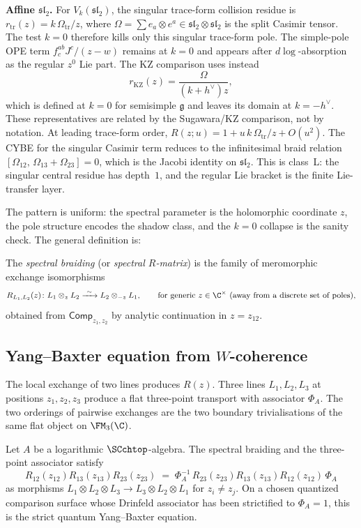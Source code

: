 \medskip
\noindent\textbf{Affine $\mathfrak{sl}_2$.}
For $V_k(\mathfrak{sl}_2)$, the singular trace-form collision residue
is \(r_{\mathrm{tr}}(z)=k\,\Omega_{\mathrm{tr}}/z\), where
\(\Omega=\sum e_a\otimes e^a\in\mathfrak{sl}_2\otimes
\mathfrak{sl}_2\) is the split Casimir tensor. The test \(k=0\)
therefore kills only this singular trace-form pole. The simple-pole
OPE term \(f^{ab}_{c}J^c/(z-w)\) remains at \(k=0\) and appears after
\(d\log\)-absorption as the regular \(z^0\) Lie part. The KZ
comparison uses instead
\[
r_{\mathrm{KZ}}(z)=\frac{\Omega}{(k+h^\vee)z},
\]
which is defined at \(k=0\) for semisimple \(\mathfrak g\) and leaves
its domain at \(k=-h^\vee\). These representatives are related by the
Sugawara/KZ comparison, not by notation. At leading trace-form order,
\(R(z;u)=1+u\,k\,\Omega_{\mathrm{tr}}/z+O(u^2)\). The CYBE for the singular Casimir
term reduces to the infinitesimal braid relation
\([\Omega_{12},\,\Omega_{13}+\Omega_{23}]=0\), which is the Jacobi
identity on \(\mathfrak{sl}_2\). This is class~L: the singular central
residue has depth~\(1\), and the regular Lie bracket is the finite
Lie-transfer layer.

\medskip
The pattern is uniform: the spectral parameter is the holomorphic coordinate $z$, the pole structure encodes the shadow class, and the $k=0$ collapse is the sanity check. The general definition is:

\begin{definition}
\label{def:spectral-braiding}
The \emph{spectral braiding} (or \emph{spectral $R$-matrix}) is the
family of meromorphic exchange isomorphisms
\[
R_{L_1,L_2}(z)\colon L_1\otimes_z L_2
 \xrightarrow{\ \sim\ } L_2\otimes_{-z} L_1,
\qquad \text{for generic } z\in \C^\times \text{ (away from a discrete set of poles)},
\]
obtained from $\mathsf{Comp}_{z_1,z_2}$ by analytic continuation in $z=z_{12}$.
\end{definition}

\subsection{Yang--Baxter equation from $W$-coherence}
\label{subsec:YBE}
\label{subsec:YBE-proof}
The local exchange of two lines produces $R(z)$. Three lines
$L_1,L_2,L_3$ at positions $z_1,z_2,z_3$ produce a flat
three-point transport with associator $\Phi_A$. The two orderings of
pairwise exchanges are the two boundary trivialisations of the same
flat object on $\FM_3(\C)$.

\begin{theorem}
\label{thm:YBE}
Let $A$ be a logarithmic $\SCchtop$-algebra.
The spectral braiding and the three-point associator satisfy
\[
R_{12}(z_{12})R_{13}(z_{13})R_{23}(z_{23})
\;=\;
\Phi_A^{-1}\,
R_{23}(z_{23})R_{13}(z_{13})R_{12}(z_{12})\,
\Phi_A
\]
as morphisms $L_1\otimes L_2\otimes L_3 \to
L_3\otimes L_2\otimes L_1$ for $z_i\neq z_j$. On a chosen
quantized comparison surface whose Drinfeld associator has been
strictified to $\Phi_A=1$, this is the strict quantum Yang--Baxter
equation.
\end{theorem}

